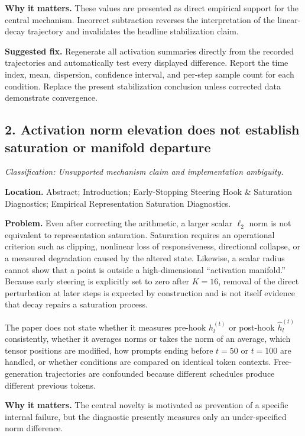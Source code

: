 \documentclass[11pt]{article}
\newcommand{\findinglabel}[1]{\textbf{#1}}
\newcommand{\classification}[1]{\textit{Classification: #1.}}
\begin{document}
\findinglabel{Why it matters.} These values are presented as direct empirical support for the central mechanism.  Incorrect subtraction reverses the interpretation of the linear-decay trajectory and invalidates the headline stabilization claim.

\findinglabel{Suggested fix.} Regenerate all activation summaries directly from the recorded trajectories and automatically test every displayed difference.  Report the time index, mean, dispersion, confidence interval, and per-step sample count for each condition.  Replace the present stabilization conclusion unless corrected data demonstrate convergence.

\subsection*{2. Activation norm elevation does not establish saturation or manifold departure}

\classification{Unsupported mechanism claim and implementation ambiguity}

\findinglabel{Location.} Abstract; Introduction; Early-Stopping Steering Hook \& Saturation Diagnostics; Empirical Representation Saturation Diagnostics.

\findinglabel{Problem.} Even after correcting the arithmetic, a larger scalar $\ell_2$ norm is not equivalent to representation saturation.  Saturation requires an operational criterion such as clipping, nonlinear loss of responsiveness, directional collapse, or a measured degradation caused by the altered state.  Likewise, a scalar radius cannot show that a point is outside a high-dimensional ``activation manifold.''  Because early steering is explicitly set to zero after $K=16$, removal of the direct perturbation at later steps is expected by construction and is not itself evidence that decay repairs a saturation process.

The paper does not state whether it measures pre-hook $h_l^{(t)}$ or post-hook $\hat h_l^{(t)}$ consistently, whether it averages norms or takes the norm of an average, which tensor positions are modified, how prompts ending before $t=50$ or $t=100$ are handled, or whether conditions are compared on identical token contexts.  Free-generation trajectories are confounded because different schedules produce different previous tokens.

\findinglabel{Why it matters.} The central novelty is motivated as prevention of a specific internal failure, but the diagnostic presently measures only an under-specified norm difference.
\end{document}
